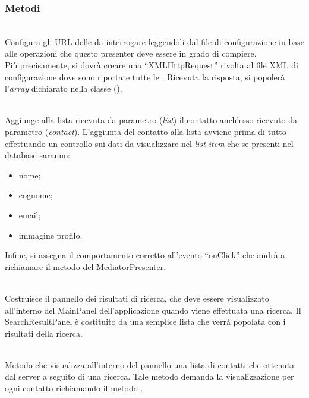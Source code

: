 \subsubsection*{Metodi}
\begin{description}
\item{}\\
Configura gli URL delle  da interrogare leggendoli dal file di configurazione in base alle operazioni che questo presenter deve essere in grado di compiere.\\
Più precisamente, si dovrà creare una ``XMLHttpRequest'' rivolta al file XML di configurazione dove sono riportate tutte le . Ricevuta la risposta, si popolerà l'\textit{array} dichiarato nella classe ().

\item{}\\
Aggiunge alla lista ricevuta da parametro (\textit{list}) il contatto anch'esso ricevuto da parametro (\textit{contact}). L'aggiunta del contatto alla lista avviene prima di tutto effettuando un controllo sui dati da visualizzare nel \textit{list item} che se presenti nel database saranno:
\begin{itemize}
\item nome;
\item cognome;
\item email;
\item immagine profilo.
\end{itemize}
Infine, si assegna il comportamento corretto all'evento ``onClick'' che andrà a richiamare il metodo  del MediatorPresenter.

\item{}\\
Costruisce il pannello dei risultati di ricerca, che deve essere visualizzato all'interno del MainPanel dell'applicazione quando viene effettuata una ricerca. Il SearchResultPanel è costituito da una semplice lista che verrà popolata con i risultati della ricerca.

\item{}\\
Metodo che visualizza all'interno del pannello una lista di contatti che ottenuta dal server a seguito di una ricerca. Tale metodo demanda la visualizzazione per ogni contatto richiamando il metodo .

\end{description}


